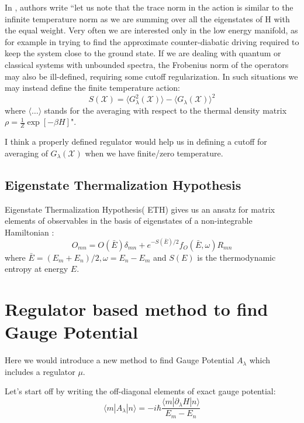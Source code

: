 \documentclass[11pt,a4paper]{article}
\begin{document}
In \cite{kolodrubetz2016geometry}, authors write ``let us note that the trace norm in the action is similar to the infinite temperature norm as we are summing over all the eigenstates of H with the equal weight. Very often we are interested only in the low energy manifold, as for example in trying to find the approximate counter-diabatic driving required to keep the system close to the ground state. If we are dealing with quantum or classical systems with unbounded spectra, the Frobenius norm of the operators may also be ill-defined, requiring some cutoff regularization. In such
situations we may instead define the finite temperature action:
\begin{equation}
S( \mathcal{X})= \langle G_{\lambda}^2( \mathcal{X}) \rangle - \langle G_{\lambda}( \mathcal{X}) \rangle ^2
\end{equation}
where $\langle \ldots \rangle$ stands for the averaging with respect to the thermal density matrix $\rho= \frac{1}{Z} \exp[-\beta H]$".

I think a properly defined regulator would help us in defining a cutoff for averaging of $G_{\lambda}(\mathcal{X} )$ when we have finite/zero temperature.

\subsection{Eigenstate Thermalization Hypothesis}
Eigenstate Thermalization Hypothesis( ETH) gives us an ansatz for matrix elements of observables in the basis of eigenstates of a non-integrable Hamiltonian \cite{d2016quantum}:
\begin{equation}
O_{mn}= O( \bar{E}) \delta_{mn} + e^{-S(\bar{E})/2} f_O(\bar{E}, \omega) R_{mn}
\end{equation}
where $\bar{E}= (E_m +E_n)/2, \omega= E_n- E_m$ and $S(E)$ is the thermodynamic entropy at energy $E$.

\section{ Regulator based method to find Gauge Potential}
Here we would introduce a new method to find Gauge Potential $A_{\lambda}$ which includes a regulator $\mu$. 

Let's start off by writing the off-diagonal elements of exact gauge potential:
\begin{equation}
\langle m |A_{\lambda} | n \rangle =-i \hbar \dfrac{\langle m |\partial_{\lambda}H | n \rangle}{E_m-E_n}
\end{equation}
\end{document}
